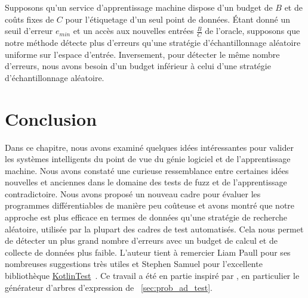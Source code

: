 Supposons qu'un service d'apprentissage machine dispose d'un budget de $B$ et de coûts fixes de $C$ pour l'étiquetage d'un seul point de données. Étant donné un seuil d'erreur $e_{min}$ et un accès aux nouvelles entrées $\frac{B}{C}$ de l'oracle, supposons que notre méthode détecte plus d'erreurs qu'une stratégie d'échantillonnage aléatoire uniforme sur l'espace d'entrée. Inversement, pour détecter le même nombre d'erreurs, nous avons besoin d'un budget inférieur à celui d'une stratégie d'échantillonnage aléatoire.

\section{Conclusion}

Dans ce chapitre, nous avons examiné quelques idées intéressantes pour valider les systèmes intelligents du point de vue du génie logiciel et de l'apprentissage machine. Nous avons constaté une curieuse ressemblance entre certaines idées nouvelles et anciennes dans le domaine des tests de fuzz et de l'apprentissage contradictoire. Nous avons proposé un nouveau cadre pour évaluer les programmes différentiables de manière peu coûteuse et avons montré que notre approche est plus efficace en termes de données qu'une stratégie de recherche aléatoire, utilisée par la plupart des cadres de test automatisés. Cela nous permet de détecter un plus grand nombre d'erreurs avec un budget de calcul et de collecte de données plus faible. L'auteur tient à remercier Liam Paull pour ses nombreuses suggestions très utiles et Stephen Samuel pour l'excellente bibliothèque \href{https://github.com/kotlintest/kotlintest}{KotlinTest}~\citep{kotlintest}. Ce travail a été en partie inspiré par \citet{lample2019deep}, en particulier le générateur d'arbres d'expression de ~\autoref{sec:prob_ad_test}.
